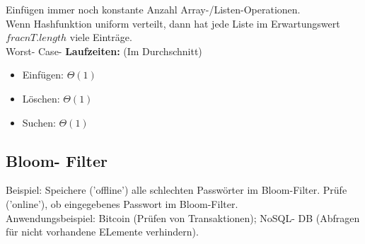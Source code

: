 \documentclass{article}
\begin{document}
            \newpage
            Einfügen immer noch konstante Anzahl Array-/Listen-Operationen.\\
            Wenn Hashfunktion uniform verteilt, dann hat jede Liste im Erwartungswert $frac{n}{T.length}$ viele Einträge.\\
            Worst- Case- \textbf{Laufzeiten:} (Im Durchschnitt)
            \begin{itemize}
                \item Einfügen: $\Theta(1)$
                \item Löschen: $\Theta(1)$
                \item Suchen: $\Theta(1)$
            \end{itemize}
        \subsection{Bloom- Filter}
            Beispiel: Speichere ('offline') alle schlechten Passwörter im Bloom-Filter. Prüfe ('online'), ob eingegebenes Passwort im Bloom-Filter.\\
            Anwendungsbeispiel: Bitcoin (Prüfen von Transaktionen); NoSQL- DB (Abfragen für nicht vorhandene ELemente verhindern).\\
            
\end{document}
